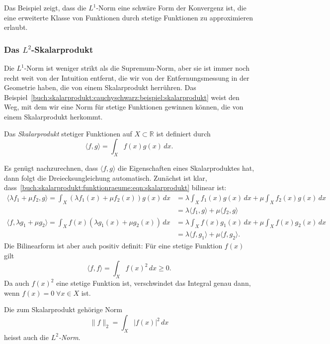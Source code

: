Das Beispiel zeigt, dass die $L^1$-Norm eine schwäre Form der Konvergenz
ist, die eine erweiterte Klasse von Funktionen durch stetige Funktionen
zu approximieren erlaubt.

%
%
\subsubsection{Das $L^2$-Skalarprodukt}
Die $L^1$-Norm ist weniger strikt als die Supremum-Norm, aber sie ist
immer noch recht weit von der Intuition entfernt, die wir von der
Entfernungsmessung in der Geometrie haben, die von einem Skalarprodukt
herrühren.
Das Beispiel~\ref{buch:skalarprodukt:cauchyschwarz:beispiel:skalarprodukt}
weist den Weg, mit dem wir eine Norm für stetige Funktionen gewinnen
können, die von einem Skalarprodukt herkommt.

\begin{definition}
\label{buch:skalarprodukt:funktionraeume:definition:skalarprodukt}
Das {\em Skalarprodukt} stetiger Funktionen auf $X\subset \mathbb{R}$
ist definiert durch
\begin{equation}
\langle f,g\rangle
=
\int_X f(x)g(x)\,dx.
\label{buch:skalarprodukt:funktionraeume:eqn:skalarprodukt}
\end{equation}
\end{definition}

Es genügt nachzurechnen, dass $\langle f,g\rangle$ die Eigenschaften
eines Skalarproduktes hat, dann folgt die Dreiecksungleichung automatisch.
Zunächst ist klar,
dass~\eqref{buch:skalarprodukt:funktionraeume:eqn:skalarprodukt}
bilinear ist:
\begin{align*}
\langle \lambda f_1+\mu f_2,g\rangle
=
\int_X (\lambda f_1(x) + \mu f_2(x)) g(x)\,dx
&=
\lambda\int_Xf_1(x)g(x)\,dx + \mu\int_X f_2(x)g(x)\,dx
\\
&=
\lambda\langle f_1,g\rangle + \mu\langle f_2,g\rangle
\\
\langle f,\lambda g_1+\mu g_2\rangle
=
\int_X f(x)(\lambda g_1(x)+\mu g_2(x))\,dx
&=
\lambda\int_X f(x)g_1(x)\,dx + \mu\int_X f(x)g_2(x)\,dx
\\
&=
\lambda\langle f,g_1\rangle + \mu\langle f,g_2\rangle.
\end{align*}
Die Bilinearform ist aber auch positiv definit: Für eine stetige
Funktion $f(x)$ gilt
\[
\langle f,f\rangle
=
\int_X f(x)^2\,dx \ge 0.
\]
Da auch $f(x)^2$ eine stetige Funktion ist,
verschwindet das Integral genau dann, wenn $f(x)=0\;\forall x\in X$ ist.

Die zum Skalarprodukt gehörige Norm 
\[
\|f\|_2
=
\int_X |f(x)|^2\,dx
\]
heisst auch die {\em $L^2$-Norm}.

